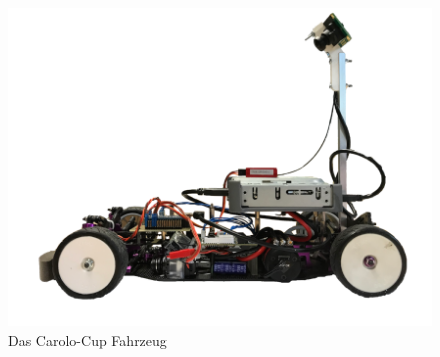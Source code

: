 \begin{figure}
	\centering
	\includegraphics[scale=0.3]{figures/Fahrzeug.png}
	\caption{Das Carolo-Cup Fahrzeug}
	\label{img:Carolo-Fahrzeug}
\end{figure}
